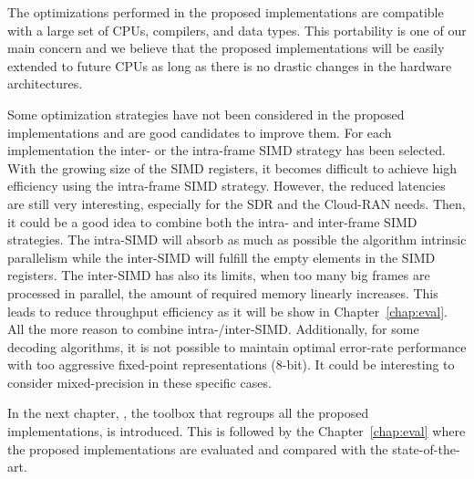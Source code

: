 The optimizations performed in the proposed implementations are compatible with
a large set of CPUs, compilers, and data types. This portability is one of our
main concern and we believe that the proposed implementations will be easily
extended to future CPUs as long as there is no drastic changes in the
hardware architectures.

Some optimization strategies have not been considered in the proposed
implementations and are good candidates to improve them. For each implementation
the inter- or the intra-frame SIMD strategy has been selected. With the growing
size of the SIMD registers, it becomes difficult to achieve high efficiency
using the intra-frame SIMD strategy. However, the reduced latencies are still
very interesting, especially for the SDR and the Cloud-RAN needs. Then, it could
be a good idea to combine both the intra- and inter-frame SIMD strategies. The
intra-SIMD will absorb as much as possible the algorithm intrinsic parallelism
while the inter-SIMD will fulfill the empty elements in the SIMD registers.
The inter-SIMD has also its limits, when too many big frames are processed in
parallel, the amount of required memory linearly increases. This leads to reduce
throughput efficiency as it will be show in Chapter~\ref{chap:eval}. All the
more reason to combine intra-/inter-SIMD. Additionally, for some decoding
algorithms, it is not possible to maintain optimal error-rate performance with
too aggressive fixed-point representations (8-bit). It could be interesting to
consider mixed-precision in these specific cases.

In the next chapter, \AFFECT, the toolbox that regroups all the proposed
implementations, is introduced. This is followed by the Chapter~\ref{chap:eval}
where the proposed implementations are evaluated and compared with the
state-of-the-art.
